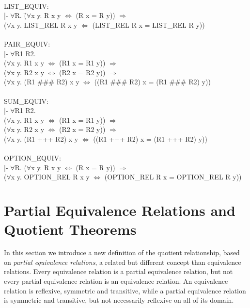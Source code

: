 \documentclass[envcountsame,runningheads]{llncs}
\newcommand{\quotient}{partial equivalence}
\newcommand{\Quotient}{Partial Equivalence}
\begin{document}
{\tt
\begin{tabbing}
LIST\_EQUIV: \\
 |- $\forall$R. \=($\forall$x y. R x y $\Leftrightarrow$ (R x = R y)) $\Rightarrow$ \\
        \>($\forall$x y. LIST\_REL R x y $\Leftrightarrow$ (LIST\_REL R x = LIST\_REL R y)) \\
\\
PAIR\_EQUIV: \\
 |- $\forall$R1 R2. \\
\>
        ($\forall$x y. R1 x y $\Leftrightarrow$ (R1 x = R1 y)) $\Rightarrow$ \\
\>
        ($\forall$x y. R2 x y $\Leftrightarrow$ (R2 x = R2 y)) $\Rightarrow$ \\
\>
        ($\forall$x y. (R1 \#\#\# R2) x y $\Leftrightarrow$ ((R1 \#\#\# R2) x = (R1 \#\#\# R2) y)) \\
\\
SUM\_EQUIV: \\
 |- $\forall$R1 R2. \\
\>
        ($\forall$x y. R1 x y $\Leftrightarrow$ (R1 x = R1 y)) $\Rightarrow$ \\
\>
        ($\forall$x y. R2 x y $\Leftrightarrow$ (R2 x = R2 y)) $\Rightarrow$ \\
\>
        ($\forall$x y. (R1 +++ R2) x y $\Leftrightarrow$ ((R1 +++ R2) x = (R1 +++ R2) y)) \\
\\
OPTION\_EQUIV: \\
 |- $\forall$R. ($\forall$x y. R x y $\Leftrightarrow$ (R x = R y)) $\Rightarrow$ \\
\>
        ($\forall$x y. OPTION\_REL R x y $\Leftrightarrow$ (OPTION\_REL R x = OPTION\_REL R y))
\end{tabbing}
}


%
\section{\Quotient{} Relations and Quotient Theorems}
%
\label{quotientrelation}

In this section we introduce a new definition of the quotient
relationship, based on {\it \quotient{} relations},
a related but different concept than equivalence relations.
Every equivalence relation is a \quotient{} relation, but
not every \quotient{} relation is an equivalence relation.
An equivalence relation is reflexive, symmetric and transitive,
while a \quotient{} relation is symmetric and transitive, but not
necessarily reflexive on all of its domain. 
\end{document}
